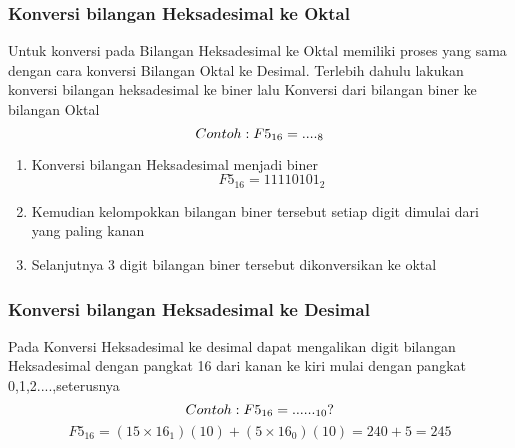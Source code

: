 \subsubsection{Konversi bilangan Heksadesimal ke Oktal}
Untuk konversi pada Bilangan Heksadesimal ke Oktal memiliki proses yang sama dengan cara konversi Bilangan Oktal ke Desimal. Terlebih dahulu lakukan konversi bilangan heksadesimal ke biner lalu Konversi dari bilangan biner ke bilangan Oktal
\begin{equation}
\\Contoh : F5_{16} = ...._{8}
\end{equation}
\begin{enumerate}
\item Konversi bilangan Heksadesimal menjadi biner \begin{equation}F5_{16} = 1111 0101_{2}\end{equation}
\item Kemudian kelompokkan bilangan biner tersebut setiap digit dimulai dari yang paling kanan
\item Selanjutnya 3 digit bilangan biner tersebut dikonversikan ke oktal
\end{enumerate}

\subsubsection{Konversi bilangan Heksadesimal ke Desimal}
Pada Konversi Heksadesimal ke desimal dapat mengalikan digit bilangan Heksadesimal dengan pangkat 16 dari kanan ke kiri mulai dengan pangkat 0,1,2....,seterusnya
\begin{equation}
\\Contoh : F5_{16} = ......_{10} ? 
\end{equation}
\break 
\begin{equation}
F5_{16} = (15 \times 16_{1})(10) + (5 \times 16_{0})(10) = 240 + 5 = 245
\end{equation}
